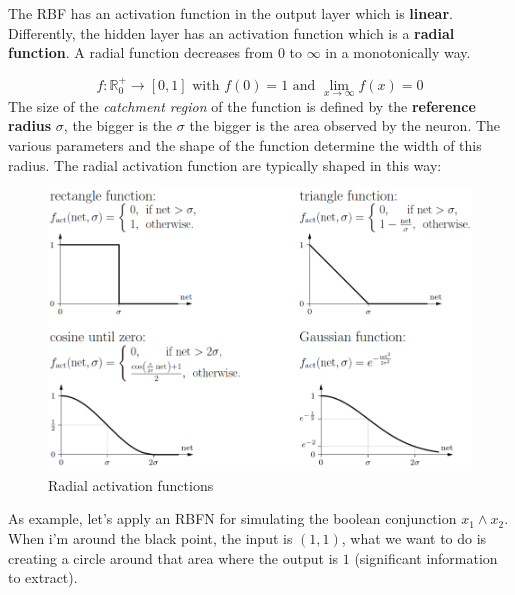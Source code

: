 \documentclass{article}
\begin{document}
The RBF has an activation function in the output layer which is \textbf{linear}. Differently, the
hidden layer has an activation function which is a \textbf{radial function}. A radial function
decreases from $0$ to $\infty$ in a monotonically way.

$$f:\mathbb{R}_0^+\rightarrow[0,1]\text{ with }f(0)=1\text{ and }\lim_{x\rightarrow\infty}f(x)=0$$
The size of the \textit{catchment region} of the function is defined by
the \textbf{reference radius} $\sigma$, the bigger is the $\sigma$ the bigger
is the area observed by the neuron. The various parameters and the shape of the function
determine the width of this radius. The radial activation function are typically shaped in this way:
\begin{figure}[H]
    \centering
    \includegraphics[scale=0.4]{images/radial_functions.png}
    \caption{Radial activation functions}
\end{figure}
As example, let's apply an RBFN for simulating the boolean conjunction $x_1\land x_2$.
When i'm around the black point, the input is $(1,1)$, what we want to do is creating a circle
around that area where the output is $1$ (significant information to extract).
\end{document}
